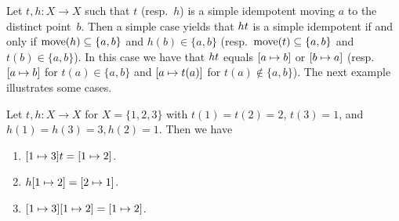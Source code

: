 \begin{remark}
Let $t,h \colon X \to X$ such that $t$ (resp.~$h$) is a simple idempotent
moving $a$ to the distinct point~$b$.
Then a simple case yields that $\concat{t}{h}$ is a simple idempotent
if and only if $\move{h} \subseteq \{a,b\}$ and $h(b) \in \{a,b\}$ 
(resp.~$\move{t} \subseteq \{a,b\}$ and $t(b) \in \{a,b\}$).
In this case we have that $\concat{t}{h}$ equals $\SI{a}{b}$ or $\SI{b}{a}$ (resp.~$\SI{a}{b}$ for $t(a) \in \{a,b\}$ 
and $\SI{a}{t(a)}$ for $t(a) \notin \{a,b\}$). The next example illustrates
some cases.
\end{remark}

\begin{example}
	Let $t, h \colon X \to X$ for $X = \{1,2,3\}$
	with $t(1) = t(2) = 2$, $t(3) = 1$, 
	and	$h(1) = h(3) = 3, h(2) = 1$. 
	Then we have
	\begin{enumerate}
		\item $\concat{t}{\SI{1}{3}} = \SI{1}{2}$.		
		
		\item $\concat{\SI{1}{2}}{h} = \SI{2}{1}$.
		
		\item $\concat{\SI{1}{2}}{\SI{1}{3}} = \SI{1}{2}$.	
	\end{enumerate}
\end{example}